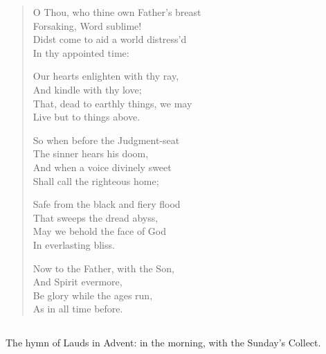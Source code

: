 \begin{verse}
O Thou, who thine own Father's breast \\
Forsaking, Word sublime! \\
Didst come to aid a world distress'd \\
In thy appointed time:

Our hearts enlighten with thy ray, \\
And kindle with thy love; \\
That, dead to earthly things, we may \\
Live but to things above.

So when before the Judgment-seat \\
The sinner hears his doom, \\
And when a voice divinely sweet \\
Shall call the righteous home;

Safe from the black and fiery flood \\
That sweeps the dread abyss, \\
May we behold the face of God \\
In everlasting bliss.

Now to the Father, with the Son, \\
And Spirit evermore, \\
Be glory while the ages run, \\
As in all time before.
\end{verse}

\subsection{}

The hymn of Lauds in Advent: in the morning, with the Sunday's Collect.


